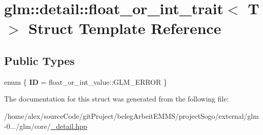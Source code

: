 \hypertarget{structglm_1_1detail_1_1float__or__int__trait}{\section{glm\-:\-:detail\-:\-:float\-\_\-or\-\_\-int\-\_\-trait$<$ T $>$ Struct Template Reference}
\label{structglm_1_1detail_1_1float__or__int__trait}
}
\subsection*{Public Types}
\begin{DoxyCompactItemize}
\item 
enum \{ {\bfseries I\-D} = float\-\_\-or\-\_\-int\-\_\-value\-:\-:G\-L\-M\-\_\-\-E\-R\-R\-O\-R
 \}
\end{DoxyCompactItemize}


The documentation for this struct was generated from the following file\-:\begin{DoxyCompactItemize}
\item 
/home/alex/source\-Code/git\-Project/beleg\-Arbeit\-E\-M\-M\-S/project\-Sogo/external/glm-\/0.../glm/core/\hyperlink{__detail_8hpp}{\-\_\-detail.\-hpp}\end{DoxyCompactItemize}
